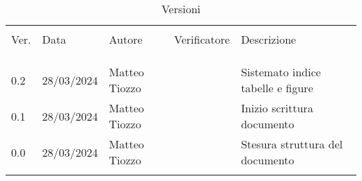 \documentclass[italian,12pt]{article} %
\begin{document}


\newpage



\begin{table}[!h]
    \caption*{Versioni}
    \begin{center}
        \begin{tabular}{ l l l l l }
            \hline                                                                                                          \\[-2ex]
            Ver. & Data       & Autore          & Verificatore              & Descrizione                                   \\
            \\[-2ex] \hline \\[-1.5ex]\\
            0.2  & 28/03/2024 & Matteo Tiozzo   &                           & Sistemato indice tabelle e figure\\
            0.1  & 28/03/2024 & Matteo Tiozzo   &                           & Inizio scrittura documento                    \\
            0.0  & 28/03/2024 & Matteo Tiozzo   &	                        & Stesura struttura del documento               \\
            \\[-1.5ex] \hline
        \end{tabular}
    \end{center}
\end{table}

\newpage

\tableofcontents

\newpage

\listoftables

\listoffigures

\newpage




\end{document}
